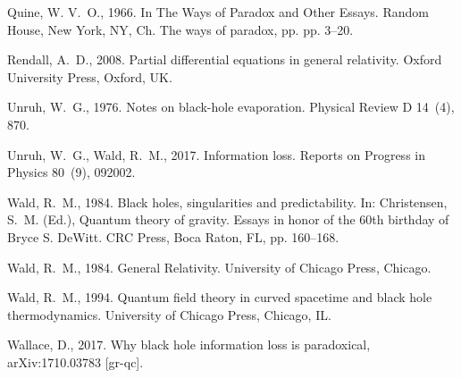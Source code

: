 \documentclass[authoryear,12pt,3p]{jowarticle}
\begin{document}
\begin{thebibliography}{32}
Quine, W. V.~O., 1966. In The Ways of Paradox and Other Essays. Random House,
  New York, NY, Ch. The ways of paradox, pp. pp. 3--20.

Rendall, A.~D., 2008. Partial differential equations in general relativity.
  Oxford University Press, Oxford, UK.

Unruh, W.~G., 1976. Notes on black-hole evaporation. Physical Review D 14~(4),
  870.

Unruh, W.~G., Wald, R.~M., 2017. Information loss. Reports on Progress in
  Physics 80~(9), 092002.

Wald, R.~M., 1984{}. Black holes, singularities and predictability.
  In: Christensen, S.~M. (Ed.), Quantum theory of gravity. Essays in honor of
  the 60th birthday of Bryce S. DeWitt. CRC Press, Boca Raton, FL, pp.
  160--168.

Wald, R.~M., 1984{}. General Relativity. University of Chicago
  Press, Chicago.

Wald, R.~M., 1994. Quantum field theory in curved spacetime and black hole
  thermodynamics. University of Chicago Press, Chicago, IL.

Wallace, D., 2017. Why black hole information loss is paradoxical,
  arXiv:1710.03783 [gr-qc].

\end{thebibliography}
\end{document}
